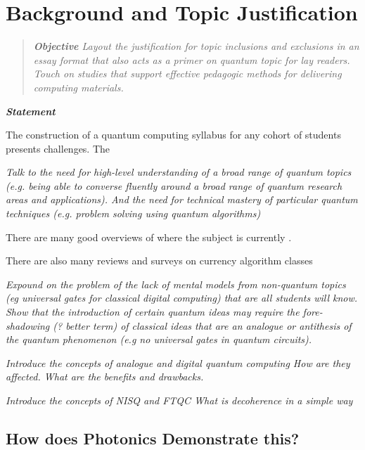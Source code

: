 
\section{}

\section{Background and Topic Justification}

\begin{quote}\itshape
	\textbf{\emph{Objective}}
	Layout the justification for topic inclusions and exclusions in an essay format that also acts as a primer on quantum topic for lay readers.
	Touch on studies that support effective pedagogic methods for delivering computing materials.
\end{quote}\ignorespacesafterend


\textbf{\emph{Statement}}


The construction of a quantum computing syllabus for any cohort of students presents challenges. 
The 

\emph{
Talk to the need for high-level understanding of a broad range of quantum topics 
(e.g. being able to converse fluently around a broad range of quantum research areas and applications).
And the need for technical mastery of particular quantum techniques 
(e.g. problem solving using quantum algorithms)
}

There are many good overviews of where the subject is currently \cite{Preskill:2023}.

\cite{Abhijith:2022}

There are also many reviews and surveys on currency algorithm classes \cite{Arnault:2024} \cite{Jordan:2024} 

\emph{
Expound on the problem of the lack of mental models from non-quantum topics (eg universal gates for classical digital computing)
that are all students will know.
Show that the introduction of certain quantum ideas may require the fore-shadowing (? better term) of classical ideas 
that are an analogue or antithesis of the quantum phenomenon (e.g no universal gates in quantum circuits).
}

\emph{
	Introduce the concepts of analogue and digital quantum computing
	How are they affected.  What are the benefits and drawbacks.
}

\emph{
	Introduce the concepts of NISQ and FTQC
	What is decoherence in a simple way
}



\subsection{How does Photonics Demonstrate this?}

